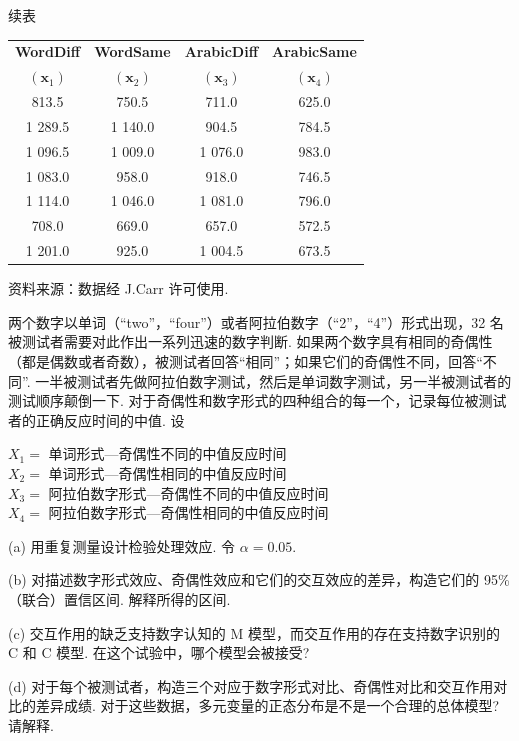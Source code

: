 
\begin{mvtable}
{\hfill 续表\par}\vspace{2pt}
\begin{tabular}{cccc}
\toprule
\textbf{WordDiff} & \textbf{WordSame} & \textbf{ArabicDiff} & \textbf{ArabicSame} \\
$(\mathbf{x}_{1})$ & $(\mathbf{x}_{2})$ & $(\mathbf{x}_{3})$ & $(\mathbf{x}_{4})$ \\
\midrule
813.5 & 750.5 & 711.0 & 625.0 \\
1 289.5 & 1 140.0 & 904.5 & 784.5 \\
1 096.5 & 1 009.0 & 1 076.0 & 983.0 \\
1 083.0 & 958.0 & 918.0 & 746.5 \\
1 114.0 & 1 046.0 & 1 081.0 & 796.0 \\
708.0 & 669.0 & 657.0 & 572.5 \\
1 201.0 & 925.0 & 1 004.5 & 673.5 \\
\bottomrule
\end{tabular}
\end{mvtable}

{ 资料来源：数据经 J.Carr 许可使用.}

两个数字以单词（“two”，“four”）或者阿拉伯数字（“2”，“4”）形式出现，32 名被测试者需要对此作出一系列迅速的数字判断. 如果两个数字具有相同的奇偶性（都是偶数或者奇数），被测试者回答“相同”；如果它们的奇偶性不同，回答“不同”. 一半被测试者先做阿拉伯数字测试，然后是单词数字测试，另一半被测试者的测试顺序颠倒一下. 对于奇偶性和数字形式的四种组合的每一个，记录每位被测试者的正确反应时间的中值. 设

$X_{1}=$ 单词形式—奇偶性不同的中值反应时间\\
$X_{2}=$ 单词形式—奇偶性相同的中值反应时间\\
$X_{3}=$ 阿拉伯数字形式—奇偶性不同的中值反应时间\\
$X_{4}=$ 阿拉伯数字形式—奇偶性相同的中值反应时间

(a) 用重复测量设计检验处理效应. 令 $\alpha=0.05$.

(b) 对描述数字形式效应、奇偶性效应和它们的交互效应的差异，构造它们的 95\%（联合）置信区间. 解释所得的区间.

(c) 交互作用的缺乏支持数字认知的 M 模型，而交互作用的存在支持数字识别的 C 和 C 模型. 在这个试验中，哪个模型会被接受?

(d) 对于每个被测试者，构造三个对应于数字形式对比、奇偶性对比和交互作用对比的差异成绩. 对于这些数据，多元变量的正态分布是不是一个合理的总体模型? 请解释.


